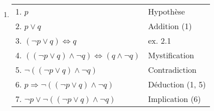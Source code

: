 \begin{enumerate}
	\item  \hspace{1em}
    \begin{center}
    \begin{tabular}{|l|l|}
    \hline
    \hspace{0.5cm} 1. $p$ & Hypothèse \\
    \hspace{0.5cm} 2. $p \lor q$ & Addition (1) \\
    \hspace{0.5cm} 3. $(\neg p \lor q) \Leftrightarrow q$ & ex. 2.1 \\
    \hspace{0.5cm} 4. $((\neg p \lor q) \land \neg q) \Leftrightarrow (q \land \neg q)$ & Mystification \\
    \hspace{0.5cm} 5. $\neg ((\neg p \lor q) \land \neg q)$ & Contradiction \\
    6. $p \Rightarrow \neg ((\neg p \lor q) \land \neg q)$ & Déduction (1, 5) \\
    7. $\neg p \lor \neg ((\neg p \lor q) \land \neg q)$ & Implication (6) \\
    \hline
    \end{tabular}
    \end{center}

    \end{enumerate}
